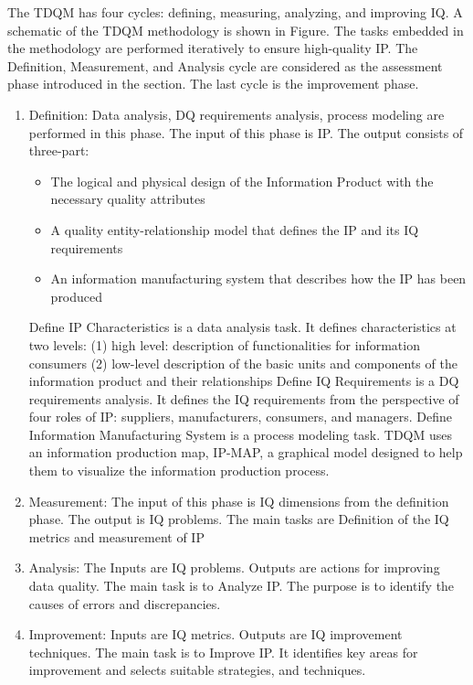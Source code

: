 \documentclass[pdftex,english,oribibl]{llncs}
\begin{document}
The TDQM has four cycles: defining, measuring, analyzing,
and improving IQ. A schematic of the TDQM methodology is shown in Figure. The tasks embedded in the methodology are performed iteratively to ensure high-quality IP. The Definition, Measurement, and  Analysis cycle are considered as the assessment phase introduced in the section.  The last cycle is the improvement phase.
\begin{enumerate}
    \item Definition: Data analysis,  DQ requirements analysis, process modeling are performed in this phase. The input of this phase is IP. The output consists of three-part:
    \begin{itemize}
        \item The logical and physical design of the Information Product with the necessary quality attributes
        \item A quality entity-relationship model that defines the IP and its IQ requirements
        \item An information manufacturing system that describes how the IP has been produced
    \end{itemize}
    Define IP Characteristics is a  data analysis task. It defines characteristics at two levels: (1) high level: description of functionalities for information consumers
(2) low-level description of the basic units and components of the information product and their relationships
Define IQ Requirements is a DQ requirements analysis. It defines the IQ requirements from the perspective of four roles of IP:  suppliers, manufacturers, consumers, and managers.
Define Information Manufacturing System is a process modeling task.
TDQM uses an information production map, IP-MAP, a graphical model designed to help them to visualize the information production process.
    \item  Measurement: The input of this phase is IQ dimensions from the definition phase. The output is IQ problems. The main tasks are Definition of the IQ metrics and measurement of IP
    \item Analysis: The Inputs are IQ problems. Outputs are actions for improving data quality. The main task is to Analyze IP. The purpose is to identify the causes of errors and discrepancies.
    \item Improvement: Inputs are  IQ metrics. Outputs are IQ improvement techniques. The main task is to Improve IP. It identifies key areas for improvement and selects suitable strategies, and techniques.
\end{enumerate}
\end{document}
